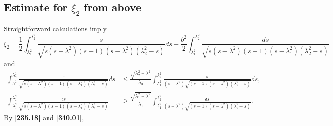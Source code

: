 \documentclass[11pt]{amsart}
\numberwithin{equation}{section}
\numberwithin{figure}{section}
\theoremstyle{plain} %
\theoremstyle{definition} %
\begin{document}
\subsection{Estimate for $\xi_2$ from above}

Straightforward calculations imply 
\[
\xi_2 
= \frac{1}{2}
\int_{\lambda_1^2}^{\lambda_2^2} \frac{s}{\sqrt{s(s-\lambda^2)(s-1)(s-\lambda_1^2)(\lambda_2^2-s)}}ds 
-\frac{b^2}{2} \int_{\lambda_1^2}^{\lambda_2^2} \frac{ds}{\sqrt{s(s-\lambda^2)(s-1)(s-\lambda_1^2)(\lambda_2^2-s)}}
\]
and  
\begin{align}
 \int_{\lambda_1^2}^{\lambda_2^2} \frac{s}{\sqrt{s(s-\lambda^2)(s-1)(s-\lambda_1^2)(\lambda_2^2-s)}}ds %
&\leq 
 \frac{\sqrt{\lambda_2^2-\lambda^2}}{\lambda_2}
\int_{\lambda_1^2}^{\lambda_2^2} \frac{s}{(s-\lambda^2)\sqrt{(s-1)(s-\lambda_1^2)(\lambda_2^2-s)}}ds, 
\label{period_estimate_1} \\
\int_{\lambda_1^2}^{\lambda_2^2} \frac{d s}{\sqrt{s(s-\lambda^2)(s-1)(s-\lambda_1^2)(\lambda_2^2-s)}} %
& \geq 
 \frac{\sqrt{\lambda_1^2-\lambda^2}}{\lambda_1}
\int_{\lambda_1^2}^{\lambda_2^2} \frac{d s}{(s-\lambda^2)\sqrt{(s-1)(s-\lambda_1^2)(\lambda_2^2-s)}} 
\label{period_estimate_2}. 
\end{align}
By \textbf{[235.18]} and \textbf{[340.01]}, 
\end{document}
